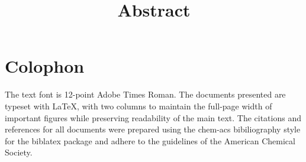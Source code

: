 \documentclass[a4paper,12pt]{article}
\date{}
\title{Abstract} %
\begin{document}
	\section*{Colophon}
	
	\vspace{1.5\baselineskip} %
	
	
	The text font is 12-point Adobe Times Roman. The documents presented are typeset with \LaTeX, with two columns to maintain the full-page width of important figures while preserving readability of the main text. The citations and references for all documents were prepared using the \textsf{chem-acs} bibiliography style for the \textsf{biblatex} package and adhere to the guidelines of the American Chemical Society. 
	 
	 
	
\end{document}
